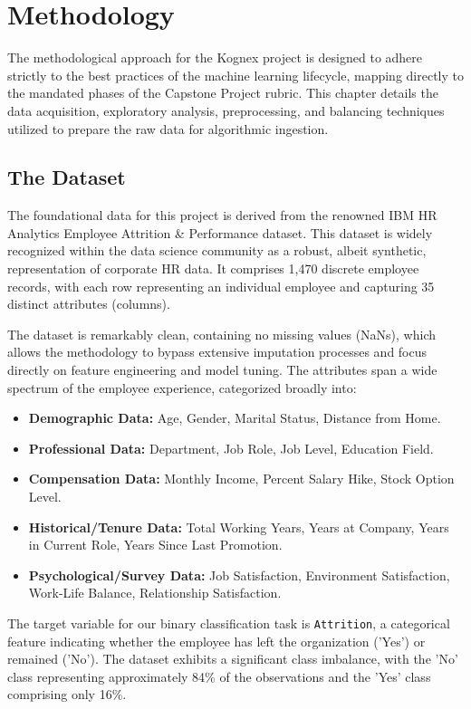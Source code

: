 \chapter{Methodology}

The methodological approach for the Kognex project is designed to adhere strictly to the best practices of the machine learning lifecycle, mapping directly to the mandated phases of the Capstone Project rubric. This chapter details the data acquisition, exploratory analysis, preprocessing, and balancing techniques utilized to prepare the raw data for algorithmic ingestion.

\section{The Dataset}
The foundational data for this project is derived from the renowned IBM HR Analytics Employee Attrition \& Performance dataset. This dataset is widely recognized within the data science community as a robust, albeit synthetic, representation of corporate HR data. It comprises 1,470 discrete employee records, with each row representing an individual employee and capturing 35 distinct attributes (columns). 

The dataset is remarkably clean, containing no missing values (NaNs), which allows the methodology to bypass extensive imputation processes and focus directly on feature engineering and model tuning. The attributes span a wide spectrum of the employee experience, categorized broadly into:
\begin{itemize}
    \item \textbf{Demographic Data:} Age, Gender, Marital Status, Distance from Home.
    \item \textbf{Professional Data:} Department, Job Role, Job Level, Education Field.
    \item \textbf{Compensation Data:} Monthly Income, Percent Salary Hike, Stock Option Level.
    \item \textbf{Historical/Tenure Data:} Total Working Years, Years at Company, Years in Current Role, Years Since Last Promotion.
    \item \textbf{Psychological/Survey Data:} Job Satisfaction, Environment Satisfaction, Work-Life Balance, Relationship Satisfaction.
\end{itemize}
The target variable for our binary classification task is \texttt{Attrition}, a categorical feature indicating whether the employee has left the organization ('Yes') or remained ('No'). The dataset exhibits a significant class imbalance, with the 'No' class representing approximately 84\% of the observations and the 'Yes' class comprising only 16\%.

